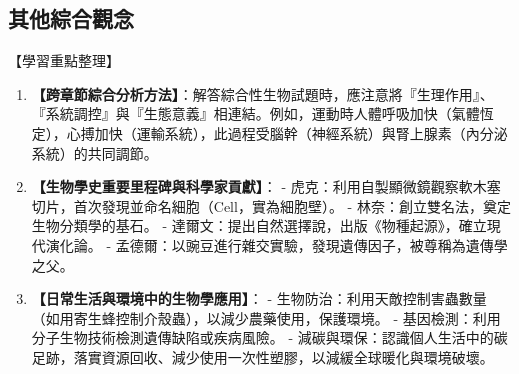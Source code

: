 \documentclass[11pt,a4paper]{article}
\begin{document}
\subsection{其他綜合觀念}
\begin{learningpoints}{【學習重點整理】}
\begin{enumerate}[label=\arabic*.]
  \item \textbf{【跨章節綜合分析方法】}：解答綜合性生物試題時，應注意將『生理作用』、『系統調控』與『生態意義』相連結。例如，運動時人體呼吸加快（氣體恆定），心搏加快（運輸系統），此過程受腦幹（神經系統）與腎上腺素（內分泌系統）的共同調節。
  \item \textbf{【生物學史重要里程碑與科學家貢獻】}：
  - 虎克：利用自製顯微鏡觀察軟木塞切片，首次發現並命名細胞（Cell，實為細胞壁）。
  - 林奈：創立雙名法，奠定生物分類學的基石。
  - 達爾文：提出自然選擇說，出版《物種起源》，確立現代演化論。
  - 孟德爾：以豌豆進行雜交實驗，發現遺傳因子，被尊稱為遺傳學之父。
  \item \textbf{【日常生活與環境中的生物學應用】}：
  - 生物防治：利用天敵控制害蟲數量（如用寄生蜂控制介殼蟲），以減少農藥使用，保護環境。
  - 基因檢測：利用分子生物技術檢測遺傳缺陷或疾病風險。
  - 減碳與環保：認識個人生活中的碳足跡，落實資源回收、減少使用一次性塑膠，以減緩全球暖化與環境破壞。
\end{enumerate}
\end{learningpoints}

\newpage
\end{document}
